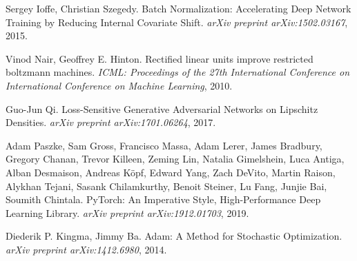 \documentclass[12pt, a4paper]{article}
\begin{document}
\begin{thebibliography}{9}
	Sergey Ioffe, Christian Szegedy. Batch Normalization: Accelerating Deep Network Training by Reducing Internal Covariate Shift. \textit{arXiv preprint arXiv:1502.03167}, 2015.
	
	Vinod Nair, Geoffrey E. Hinton. Rectified linear units improve restricted boltzmann machines. \textit{ICML: Proceedings of the 27th International Conference on International Conference on Machine Learning}, 2010.
	
	Guo-Jun Qi. Loss-Sensitive Generative Adversarial Networks on Lipschitz Densities. \textit{arXiv preprint arXiv:1701.06264}, 2017.
	
	Adam Paszke, Sam Gross, Francisco Massa, Adam Lerer, James Bradbury, Gregory Chanan, Trevor Killeen, Zeming Lin, Natalia Gimelshein, Luca Antiga, Alban Desmaison, Andreas Köpf, Edward Yang, Zach DeVito, Martin Raison, Alykhan Tejani, Sasank Chilamkurthy, Benoit Steiner, Lu Fang, Junjie Bai, Soumith Chintala. PyTorch: An Imperative Style, High-Performance Deep Learning Library. \textit{arXiv preprint arXiv:1912.01703}, 2019.
	
	Diederik P. Kingma, Jimmy Ba. Adam: A Method for Stochastic Optimization. \textit{arXiv preprint arXiv:1412.6980}, 2014.
\end{thebibliography}
\end{document}

